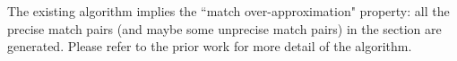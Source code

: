 The existing algorithm implies the ``match over-approximation" property: all the precise match pairs (and maybe some unprecise match pairs) in the section are generated.
Please refer to the prior work \cite{DBLP:conf/kbse/HuangMM13} for more detail of the algorithm. 


 
 

\begin{comment}
$\mathit{P}$ is a set of all the processes in a CTP. 
$frm_t$ is a set of the unique identifiers of all the senders for the receiver $p_t$. 
The identifier of a sender can be removed from $frm_t$ once the sender has no send to be distributed to $p_t$.
The list $R_t$ contains all the sequential receives in process $p_t$.
$\mathit{NR}_{t}$ is the number of all the receives in $R_t$.
The list $S_{tf}$ contains all the sequential sends from the sender $p_f$ to the receiver $p_t$. 
$\mathit{NS}_{tf}$ is the number of the sends in $S_{tf}$ that are distributed to a specific section.

Given the data structures defined, the presentation explains \algoref{algo:main} in detail.
The algorithm iteratively checks each receive at line 2 until $R_t$ is empty.  
$\mathrm{SECTIONMATCH}$ computes the number of receives in each section at line 3. The value is assigned to $N_k$. 
$\mathrm{DISTRIBUTESENDS}$ updates the count of the distributed sends ($\mathit{NS}$) from each sender to a common section in the receiver $p_t$ at line 7. 
$\mathit{NS_{tf}}$ is initialized for each sender $p_f$ at line 4 through line 6.
$\mathrm{MATCHAPPROX}$ then stores the generated match pairs for each section in $M$ at line 8. 
Finally, the receives and the sends in each section are removed from the CTP at line 9 through line 14. 
The function $\mathrm{REMOVE}$ removes elements from the beginning of a list given two inputs: the list to remove from and the number of operations to remove. 

\subsection{Section Match}


\end{comment}
